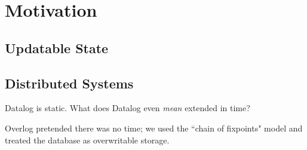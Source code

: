\section{Motivation}

\subsection{Updatable State}



\subsection{Distributed Systems}

Datalog is static.  What does Datalog even \emph{mean} extended in time?

Overlog pretended there was no time; we used the ``chain of fixpoints" model and treated the database as overwritable storage. 
